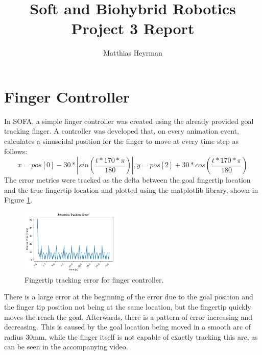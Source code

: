 \documentclass[a4paper, onecolumn, 10pt]{IEEEtran}
\begin{document}
\title{Soft and Biohybrid Robotics Project 3 Report}
\author{Matthias Heyrman}
\date{}
\maketitle

\section{Finger Controller}
\label{sec::3}

In SOFA, a simple finger controller was created using the already provided goal tracking finger. A controller was developed that, on every animation event, calculates a sinusoidal position for the finger to move at every time step as follows:
\begin{equation}
	x = pos[0] - 30 * |sin(\frac{t * 170 * \pi}{180})|,  y = pos[2] + 30 * cos(\frac{t * 170 * \pi}{180})
\end{equation}
The error metrics were tracked as the delta between the goal fingertip location and the true fingertip location and plotted using the matplotlib library, shown in Figure \ref{fig1}.
\begin{figure}[!htbp]
        \centering
        \captionsetup{justification=centering}
        \centering
        \includegraphics[width=0.45\textwidth]{Task3_error_2.png} 
        \caption{Fingertip tracking error for finger controller.}
        \label{fig1}
\end{figure}
There is a large error at the beginning of the error due to the goal position and the finger tip position not being at the same location, but the fingertip quickly moves the reach the goal. Afterwards, there is a pattern of error increasing and decreasing. This is caused by the goal location being moved in a smooth arc of radius 30mm, while the finger itself is not capable of exactly tracking this arc, as can be seen in the accompanying video.
\end{document}
